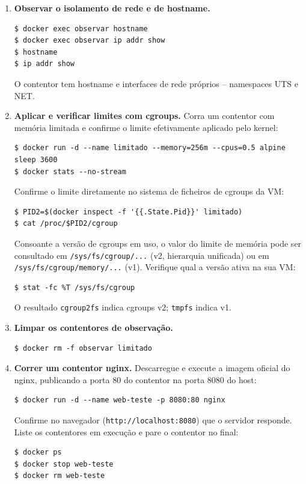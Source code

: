 \documentclass[11pt,a4paper]{article}
\begin{document}
\begin{enumerate}[label=\arabic*.]
  \item \textbf{Observar o isolamento de rede e de hostname.}
\begin{lstlisting}
$ docker exec observar hostname
$ docker exec observar ip addr show
$ hostname
$ ip addr show
\end{lstlisting}
  O contentor tem hostname e interfaces de rede próprios -- namespaces UTS e NET.

  \item \textbf{Aplicar e verificar limites com cgroups.} Corra um contentor com memória limitada e confirme o limite efetivamente aplicado pelo kernel:
\begin{lstlisting}
$ docker run -d --name limitado --memory=256m --cpus=0.5 alpine sleep 3600
$ docker stats --no-stream
\end{lstlisting}
  Confirme o limite diretamente no sistema de ficheiros de cgroups da VM:
\begin{lstlisting}
$ PID2=$(docker inspect -f '{{.State.Pid}}' limitado)
$ cat /proc/$PID2/cgroup
\end{lstlisting}
  Consoante a versão de cgroups em uso, o valor do limite de memória pode ser consultado em \texttt{/sys/fs/cgroup/...} (v2, hierarquia unificada) ou em \texttt{/sys/fs/cgroup/memory/...} (v1). Verifique qual a versão ativa na sua VM:
\begin{lstlisting}
$ stat -fc %T /sys/fs/cgroup
\end{lstlisting}
  O resultado \texttt{cgroup2fs} indica cgroups v2; \texttt{tmpfs} indica v1.

  \item \textbf{Limpar os contentores de observação.}
\begin{lstlisting}
$ docker rm -f observar limitado
\end{lstlisting}

  \item \textbf{Correr um contentor nginx.} Descarregue e execute a imagem oficial do nginx, publicando a porta 80 do contentor na porta 8080 do host:
\begin{lstlisting}
$ docker run -d --name web-teste -p 8080:80 nginx
\end{lstlisting}
  Confirme no navegador (\texttt{http://localhost:8080}) que o servidor responde. Liste os contentores em execução e pare o contentor no final:
\begin{lstlisting}
$ docker ps
$ docker stop web-teste
$ docker rm web-teste
\end{lstlisting}


\end{enumerate}
\end{document}
